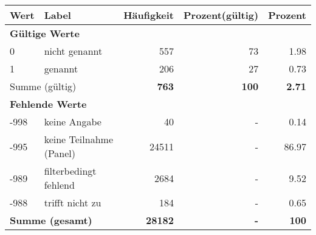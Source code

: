      \begin{longtable}{lXrrr}
     \toprule
     \textbf{Wert} & \textbf{Label} & \textbf{Häufigkeit} & \textbf{Prozent(gültig)} & \textbf{Prozent} \\
     \endhead
     \midrule
     \multicolumn{5}{l}{\textbf{Gültige Werte}}\\

     0 &
     \multicolumn{1}{X}{ nicht genannt   } &


       \num{557} &
       \num[round-mode=places,round-precision=2]{73} &
         \num[round-mode=places,round-precision=2]{1,98} \\

     1 &
     \multicolumn{1}{X}{ genannt   } &


       \num{206} &
       \num[round-mode=places,round-precision=2]{27} &
         \num[round-mode=places,round-precision=2]{0,73} \\
     \midrule
     \multicolumn{2}{l}{Summe (gültig)} &
       \textbf{\num{763}} &
     \textbf{100} &
       \textbf{\num[round-mode=places,round-precision=2]{2,71}} \\
     \multicolumn{5}{l}{\textbf{Fehlende Werte}}\\
       -998 &
       keine Angabe &
         \num{40} &
        - &
         \num[round-mode=places,round-precision=2]{0,14} \\
       -995 &
       keine Teilnahme (Panel) &
         \num{24511} &
        - &
         \num[round-mode=places,round-precision=2]{86,97} \\
       -989 &
       filterbedingt fehlend &
         \num{2684} &
        - &
         \num[round-mode=places,round-precision=2]{9,52} \\
       -988 &
       trifft nicht zu &
         \num{184} &
        - &
         \num[round-mode=places,round-precision=2]{0,65} \\
     \midrule
     \multicolumn{2}{l}{\textbf{Summe (gesamt)}} &
          \textbf{\num{28182}} &
        \textbf{-} &
        \textbf{100} \\
     \bottomrule
     \end{longtable}
     
